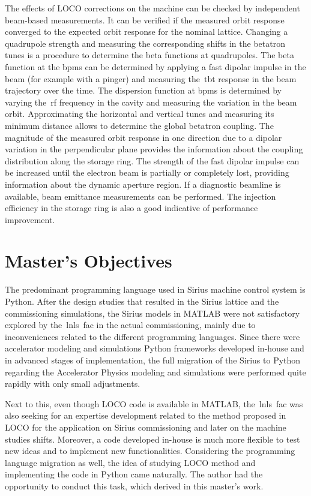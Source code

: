 The effects of LOCO corrections on the machine can be checked by independent beam-based measurements. It can be verified if the measured orbit response converged to the expected orbit response for the nominal lattice. Changing a quadrupole strength and measuring the corresponding shifts in the betatron tunes is a procedure to determine the beta functions at quadrupoles. The beta function at the \glspl{bpm} can be determined by applying a fast dipolar impulse in the beam (for example with a pinger) and measuring the~\gls{tbt} response in the beam trajectory over the time. The dispersion function at \glspl{bpm} is determined by varying the~\gls{rf} frequency in the cavity and measuring the variation in the beam orbit. Approximating the horizontal and vertical tunes and measuring its minimum distance allows to determine the global betatron coupling. The magnitude of the measured orbit response in one direction due to a dipolar variation in the perpendicular plane provides the information about the coupling distribution along the storage ring. The strength of the fast dipolar impulse can be increased until the electron beam is partially or completely lost, providing information about the dynamic aperture region. If a diagnostic beamline is available, beam emittance measurements can be performed. The injection efficiency in the storage ring is also a good indicative of performance improvement.
\section{Master's Objectives}\label{sec:master_obj}
The predominant programming language used in Sirius machine control system is Python. After the design studies that resulted in the Sirius lattice and the commissioning simulations, the Sirius models in MATLAB were not satisfactory explored by the~\gls{lnls}~\gls{fac} in the actual commissioning, mainly due to inconveniences related to the different programming languages. Since there were accelerator modeling and simulations Python frameworks developed in-house and in advanced stages of implementation, the full migration of the Sirius to Python regarding the Accelerator Physics modeling and simulations were performed quite rapidly with only small adjustments.
 
Next to this, even though LOCO code is available in MATLAB, the~\gls{lnls}~\gls{fac} was also seeking for an expertise development related to the method proposed in LOCO for the application on Sirius commissioning and later on the machine studies shifts. Moreover, a code developed in-house is much more flexible to test new ideas and to implement new functionalities. Considering the programming language migration as well, the idea of studying LOCO method and implementing the code in Python came naturally. The author had the opportunity to conduct this task, which derived in this master's work. 

